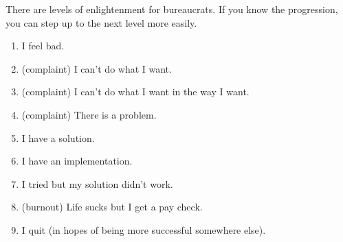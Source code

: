 
There are levels of enlightenment for bureaucrats. If you know the progression, you can step up to the next level more easily.
\begin{enumerate}
    \item I feel bad.
    \item (complaint) I can't do what I want.
    \item (complaint) I can't do what I want in the way I want.
    \item (complaint) There is a problem.
    \item I have a solution.
    \item I have an implementation.
    \item I tried but my solution didn't work.
    \item (burnout) Life sucks but I get a pay check.
    \item I quit (in hopes of being more successful somewhere else).
\end{enumerate}
